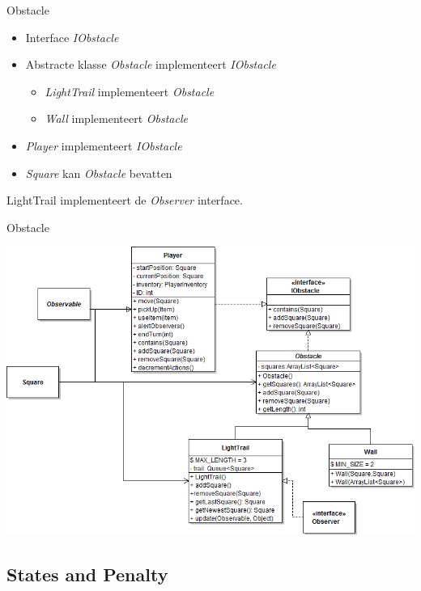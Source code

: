 \documentclass[t]{beamer}
\begin{document}
\begin{frame}{Obstacle}
\begin{center}
\begin{itemize}
	\item Interface \textit{IObstacle}
	\item  Abstracte klasse \textit{Obstacle} implementeert \textit{IObstacle}
	\begin{itemize}
		\item \textit{LightTrail} implementeert \textit{Obstacle}
		\item \textit{Wall} implementeert \textit{Obstacle}
	\end{itemize}
	\item \textit{Player} implementeert \textit{IObstacle}
	\item \textit{Square} kan \textit{Obstacle} bevatten
\end{itemize}
LightTrail implementeert de \textit{Observer} interface.
\end{center}
\end{frame}


\begin{frame}{Obstacle}
\begin{center}
\includegraphics[width=0.70\linewidth]{images/obstacleObserverClassDiagram}
\end{center}
\end{frame}

\subsection{States and Penalty}
\end{document}
